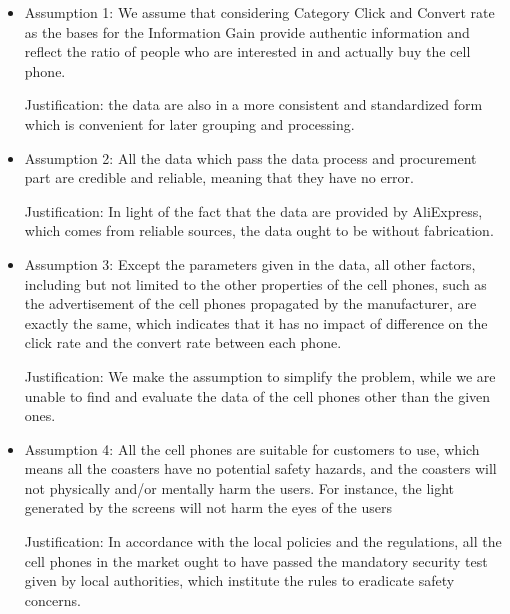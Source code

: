 \begin{itemize}
	\item Assumption 1: We assume that considering Category Click and Convert rate as the bases for the Information Gain provide authentic information and reflect the ratio of people who are interested in and actually buy the cell phone. 
	
	Justification: the data are also in a more consistent and standardized form which is convenient for later grouping and processing.
\end{itemize}



\begin{itemize}
	\item Assumption 2: All the data which pass the data process and procurement part are credible and reliable, meaning that they have no error. 

Justification: In light of the fact that the data are provided by AliExpress, which comes from reliable sources, the data ought to be without fabrication. 
\end{itemize}

\begin{itemize}
	\item Assumption 3: Except the parameters given in the data, all other factors, including but not limited to the other properties of the cell phones, such as the advertisement of the cell phones propagated by the manufacturer, are exactly the same, which indicates that it has no impact of difference on the click rate and the convert rate between each phone. 

Justification: We make the assumption to simplify the problem, while we are unable to find and evaluate the data of the cell phones other than the given ones.
\end{itemize}

\begin{itemize}
	\item Assumption 4: All the cell phones are suitable for customers to use, which means all the coasters have no potential safety hazards, and the coasters will not physically and/or mentally harm the users. For instance, the light generated by the screens will not harm the eyes of the users

Justification: In accordance with the local policies and the regulations, all the cell phones in the market ought to have passed the mandatory security test given by local authorities, which institute the rules to eradicate safety concerns.

\end{itemize}
